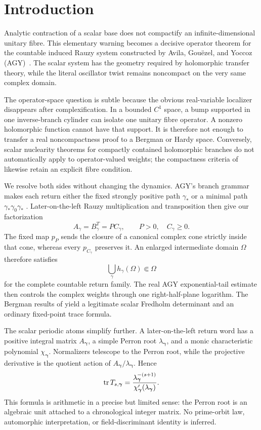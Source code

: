 \section{Introduction}
\label{sec:introduction}

Analytic contraction of a scalar base does not compactify an
infinite-dimensional unitary fibre.  This elementary warning becomes a
decisive operator theorem for the countable induced Rauzy system constructed
by Avila, Gou\"ezel, and Yoccoz (AGY)~\citep{agy2006}.  The scalar system has
the geometry required by holomorphic transfer theory, while the literal
oscillator twist remains noncompact on the very same complex domain.

The operator-space question is subtle because the obvious real-variable
localizer disappears after complexification.  In a bounded \(C^1\) space, a
bump supported in one inverse-branch cylinder can isolate one unitary fibre
operator.  A nonzero holomorphic function cannot have that support.  It is
therefore not enough to transfer a real noncompactness proof to a Bergman or
Hardy space.  Conversely, scalar nuclearity theorems for compactly contained
holomorphic branches do not automatically apply to operator-valued weights;
the compactness criteria of \citet{bonet2012} likewise retain an explicit
fibre condition.

We resolve both sides without changing the dynamics.  AGY's branch grammar
makes each return either the fixed strongly positive path \(\gamma_*\) or a
minimal path \(\gamma_*\gamma_0\gamma_*\)
\citep[Section~4.1.3 and Lemma~4.4, pp.~162, 165]{agy2006}.  Later-on-the-left
Rauzy multiplication and transposition then give our factorization
\[
 A_\gamma=B_\gamma^T=P C_\gamma,
 \qquad P>0,\quad C_\gamma\geq0.
\]
The fixed map \(p_P\) sends the closure of a canonical complex cone strictly
inside that cone, whereas every \(p_{C_\gamma}\) preserves it.  An enlarged
intermediate domain \(\Omega\) therefore satisfies
\[
 \bigcup_{\gamma}h_\gamma(\Omega)\Subset\Omega
\]
for the complete countable return family.  The real AGY exponential-tail
estimate then controls the complex weights through one right-half-plane
logarithm.  The Bergman results of
\citet{bandtlow2008ruelle,bandtlow2008explicit} yield a legitimate scalar
Fredholm determinant and an ordinary fixed-point trace formula.

The scalar periodic atoms simplify further.  A later-on-the-left return word
has a positive integral matrix \(A_{\boldsymbol\gamma}\), a simple Perron
root \(\lambda_{\boldsymbol\gamma}\), and a monic characteristic polynomial
\(\chi_{\boldsymbol\gamma}\).  Normalizers telescope to the Perron root,
while the projective derivative is the quotient action of
\(A_{\boldsymbol\gamma}/\lambda_{\boldsymbol\gamma}\).  Hence
\begin{equation}
 \operatorname{tr} T_{s,\boldsymbol\gamma}
 =\frac{\lambda_{\boldsymbol\gamma}^{-(s+1)}}
 {\chi_{\boldsymbol\gamma}'(\lambda_{\boldsymbol\gamma})}.
 \label{eq:intro-trace-atom}
\end{equation}
This formula is arithmetic in a precise but limited sense: the Perron root
is an algebraic unit attached to a chronological integer matrix.  No
prime-orbit law, automorphic interpretation, or field-discriminant identity
is inferred.

